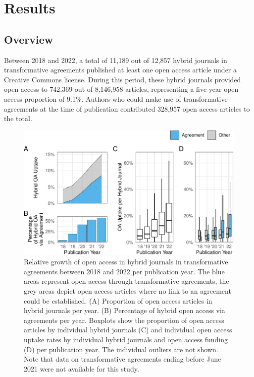 \documentclass[a4paper,man,floatsintext,longtable,noextraspace,12pt]{apa6}
\begin{document}
\hypertarget{results}{%
\section{Results}\label{results}}

\hypertarget{overview}{%
\subsection{Overview}\label{overview}}

Between 2018 and 2022, a total of 11,189 out of 12,857 hybrid journals
in transformative agreements published at least one open access article
under a Creative Commons license. During this period, these hybrid
journals provided open access to 742,369 out of 8,146,958 articles,
representing a five-year open access proportion of 9.1\%. Authors who
could make use of transformative agreements at the time of publication
contributed 328,957 open access articles to the total.

\begin{figure}[ht!]

{\centering \includegraphics[width=0.99\linewidth,]{fig/results_overview-1} 

}

\caption{Relative growth of open access in hybrid journals in transformative agreements between 2018 and 2022 per publication year. The blue areas represent open access through transformative agreements, the grey areas depict open access articles where no link to an agreement could be established. (A) Proportion of open access articles in hybrid journals per year. (B) Percentage of hybrid open access via agreements per year. Boxplots show the proportion of open access articles by individual hybrid journals (C) and individual open access uptake rates by individual hybrid journals and open access funding (D) per publication year. The individual outliers are not shown. Note that data on transformative agreements ending before June 2021 were not available for this study.}\label{fig:results_overview}
\end{figure}
\end{document}
